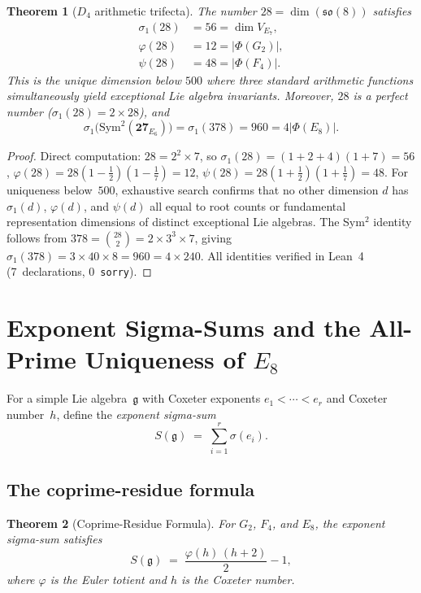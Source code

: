 \documentclass[11pt]{amsart}
\theoremstyle{plain}
\newtheorem{theorem}{Theorem}[section]
\theoremstyle{definition}
\theoremstyle{remark}
\newcommand{\fg}{\mathfrak{g}}
\renewcommand{\Phi}{\varPhi}
\begin{document}
\begin{theorem}[$D_4$ arithmetic trifecta]\label{thm:d4-trifecta}
The number $28 = \dim(\mathfrak{so}(8))$ satisfies
\begin{align*}
\sigma_1(28) &= 56 = \dim V_{E_7}, \\
\varphi(28) &= 12 = |\Phi(G_2)|, \\
\psi(28) &= 48 = |\Phi(F_4)|.
\end{align*}
This is the unique dimension below $500$ where three standard arithmetic
functions simultaneously yield exceptional Lie algebra invariants.
Moreover, $28$ is a perfect number ($\sigma_1(28) = 2 \times 28$), and
\[
  \sigma_1\bigl(\mathrm{Sym}^2(\mathbf{27}_{E_6})\bigr)
  = \sigma_1(378) = 960 = 4|\Phi(E_8)|.
\]
\end{theorem}

\begin{proof}
Direct computation: $28 = 2^2 \times 7$, so
$\sigma_1(28) = (1+2+4)(1+7) = 56$,
$\varphi(28) = 28(1-\tfrac{1}{2})(1-\tfrac{1}{7}) = 12$,
$\psi(28) = 28(1+\tfrac{1}{2})(1+\tfrac{1}{7}) = 48$.
For uniqueness below~$500$, exhaustive search confirms that no other
dimension $d$ has $\sigma_1(d)$, $\varphi(d)$, and $\psi(d)$ all equal
to root counts or fundamental representation dimensions of distinct
exceptional Lie algebras.
The Sym$^2$ identity follows from $378 = \binom{28}{2} = 2 \times 3^3 \times 7$,
giving $\sigma_1(378) = 3 \times 40 \times 8 = 960 = 4 \times 240$.
All identities verified in Lean~4 (7~declarations, 0~\texttt{sorry}).
\end{proof}

\section{Exponent Sigma-Sums and the All-Prime Uniqueness of $E_8$}
\label{sec:sigma-sums}

For a simple Lie algebra~$\fg$ with Coxeter exponents
$e_1 < \cdots < e_r$ and Coxeter number~$h$, define the
\emph{exponent sigma-sum}
\[
  S(\fg) \;=\; \sum_{i=1}^{r} \sigma(e_i).
\]

\subsection{The coprime-residue formula}

\begin{theorem}[Coprime-Residue Formula]\label{thm:coprime-residue}
For $G_2$, $F_4$, and $E_8$, the exponent sigma-sum satisfies
\[
  S(\fg) \;=\; \frac{\varphi(h)\,(h+2)}{2} - 1,
\]
where $\varphi$ is the Euler totient and $h$ is the Coxeter number.
\end{theorem}
\end{document}
